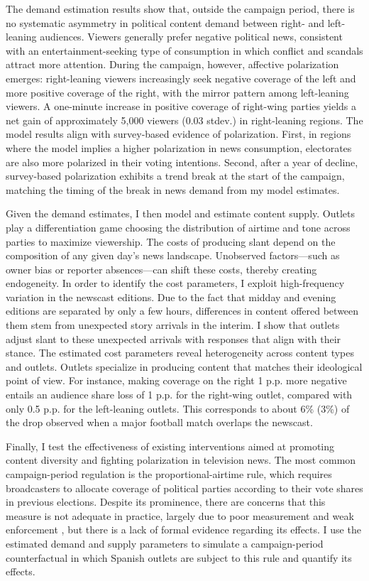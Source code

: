 \documentclass[12pt]{article}
\begin{document}
The demand estimation results show that, outside the campaign period, there is no systematic asymmetry in political content demand between right- and left-leaning audiences. Viewers generally prefer negative political news, consistent with an entertainment-seeking type of consumption in which conflict and scandals attract more attention. During the campaign, however, affective polarization emerges: right-leaning viewers increasingly seek negative coverage of the left and more positive coverage of the right, with the mirror pattern among left-leaning viewers. A one-minute increase in positive coverage of right-wing parties yields a net gain of approximately 5,000 viewers (0.03 stdev.)  in right-leaning regions. The model results align   with survey-based evidence of polarization. First, in regions where the model implies a higher polarization in news consumption, electorates are also more polarized in their voting intentions. Second, after a year of decline, survey-based polarization exhibits a trend break at the start of the campaign, matching the timing of the break in news demand  from my model estimates.

Given the demand estimates, I then model and estimate content supply. Outlets play a differentiation game choosing the distribution of airtime and tone across parties to maximize viewership. The costs of producing slant depend on the composition of any given day's news landscape. Unobserved factors—such as owner bias or reporter absences—can shift these costs, thereby creating endogeneity. In order to identify the  cost parameters, I exploit high-frequency variation in the newscast editions. Due to the fact that midday and evening editions are separated by only a few hours, differences in content offered between them stem from unexpected story arrivals in the interim. I show that outlets adjust slant to these unexpected arrivals with responses that align  with their stance. The estimated cost parameters reveal heterogeneity  across content types and  outlets. Outlets specialize in producing content that matches their ideological point of view. For instance, making coverage on the right 1 p.p. more negative  entails an audience share loss of 1 p.p. for the right-wing outlet, compared with only 0.5 p.p. for the left-leaning outlets. This corresponds to about 6\% (3\%) of the drop observed when a major football match overlaps the newscast.




Finally, I test the effectiveness of existing  interventions aimed at promoting content diversity and fighting polarization in television news. The most common campaign-period regulation  is the proportional-airtime rule, which requires broadcasters to allocate coverage of political parties according to their vote shares in previous elections. Despite its prominence, there are concerns that this measure is not adequate in practice, largely due to poor measurement and weak enforcement \citep{cage_assemblee}, but there is a lack of formal evidence regarding its effects. I use the estimated demand and supply parameters to simulate a campaign-period counterfactual in which Spanish outlets are subject to this rule and quantify its effects.
\end{document}
